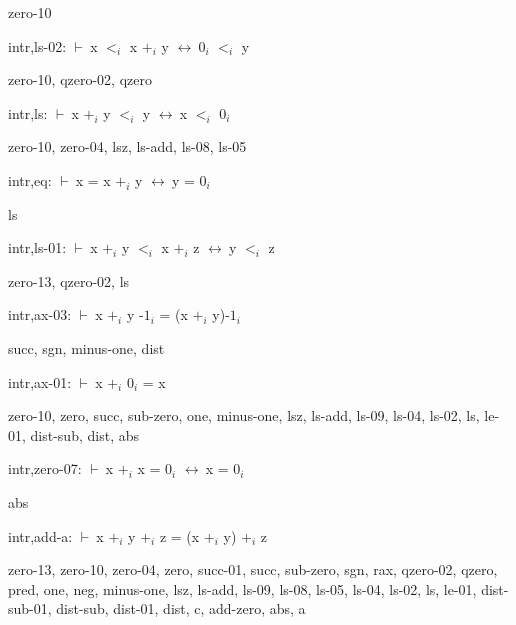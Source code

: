 \documentclass[a4paper]{article}
\newcommand{\Fol}{\mbox{$\vdash\ $}}
\newcommand{\Equiv}{\mbox{$\leftrightarrow\ $}}
\begin{document}
zero-10

\bigskip

intr,ls-02: 
 \Fol x $\mbox{$<$}_{i}$ x $\mbox{+}_{i}$ y \Equiv $\mbox{0}_{i}$ $\mbox{$<$}_{i}$ y



zero-10, qzero-02, qzero

\bigskip

intr,ls: 
 \Fol x $\mbox{+}_{i}$ y $\mbox{$<$}_{i}$ y \Equiv x $\mbox{$<$}_{i}$ $\mbox{0}_{i}$



zero-10, zero-04, lsz, ls-add, ls-08, ls-05

\bigskip

intr,eq: 
 \Fol x = x $\mbox{+}_{i}$ y \Equiv y = $\mbox{0}_{i}$



ls

\bigskip

intr,ls-01: 
 \Fol x $\mbox{+}_{i}$ y $\mbox{$<$}_{i}$ x $\mbox{+}_{i}$ z \Equiv y $\mbox{$<$}_{i}$ z



zero-13, qzero-02, ls

\bigskip

intr,ax-03: 
 \Fol x $\mbox{+}_{i}$ y $\mbox{-1}_{i}$ = (x $\mbox{+}_{i}$ y)$\mbox{-1}_{i}$



succ, sgn, minus-one, dist

\bigskip

intr,ax-01: 
 \Fol x $\mbox{+}_{i}$ $\mbox{0}_{i}$ = x



zero-10, zero, succ, sub-zero, one, minus-one, lsz, ls-add, ls-09, ls-04, ls-02, ls, le-01, dist-sub, dist, abs

\bigskip

intr,zero-07: 
 \Fol x $\mbox{+}_{i}$ x = $\mbox{0}_{i}$ \Equiv x = $\mbox{0}_{i}$



abs

\bigskip

intr,add-a: 
 \Fol x $\mbox{+}_{i}$ y $\mbox{+}_{i}$ z = (x $\mbox{+}_{i}$ y) $\mbox{+}_{i}$ z



zero-13, zero-10, zero-04, zero, succ-01, succ, sub-zero, sgn, rax, qzero-02, qzero, pred, one, neg, minus-one, lsz, ls-add, ls-09, ls-08, ls-05, ls-04, ls-02, ls, le-01, dist-sub-01, dist-sub, dist-01, dist, c, add-zero, abs, a

\bigskip
\end{document}
